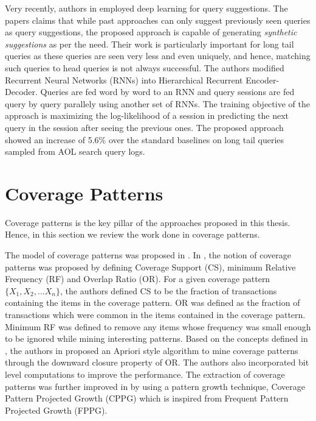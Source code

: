 Very recently, authors in \cite{sordoni2015hierarchical} employed deep learning for query suggestions. The papers claims that while past approaches can only suggest previously seen queries as query suggestions, the proposed approach is capable of generating \textit{synthetic suggestions} as per the need. Their work is particularly important for long tail queries as these queries are seen very less and even uniquely, and hence, matching such queries to head queries is not always successful. The authors modified Recurrent Neural Networks (RNNs) into Hierarchical Recurrent Encoder-Decoder. Queries are fed word by word to an RNN and  query sessions are fed query by query parallely using another set of RNNs. The training objective of the approach is maximizing the log-likelihood of a session in predicting the next query in the session after seeing the previous ones. The proposed approach showed an increase of 5.6\% over the standard baselines on long tail queries sampled from AOL search query logs.


\section{Coverage Patterns}
Coverage patterns is the key pillar of the approaches proposed in this thesis. Hence, in this section we review the work done in coverage patterns.

The model of coverage patterns was proposed in \cite{sripada2011coverage, srinivas2012discovering}. In \cite{sripada2011coverage}, the notion of coverage patterns was proposed by defining Coverage Support (CS), minimum Relative Frequency (RF) and Overlap Ratio (OR). For a given coverage pattern $\{X_{1}, X_{2}, ... X_{n}\}$, the authors defined CS to be the fraction of transactions containing the items in the coverage pattern. OR was defined as the fraction of transactions which were common in the items contained in the coverage pattern. Minimum RF was defined to remove any items whose frequency was small enough to be ignored while mining interesting patterns. Based on the concepts defined in \cite{sripada2011coverage}, the authors in \cite{srinivas2012discovering} proposed an Apriori style algorithm to mine coverage patterns through the downward closure property of OR. The authors also incorporated bit level computations to improve the performance. The extraction of coverage patterns was further improved in \cite{srinivas2014mining} by using a pattern growth technique, Coverage
Pattern Projected Growth (CPPG) which is inspired from Frequent Pattern Projected Growth (FPPG).

